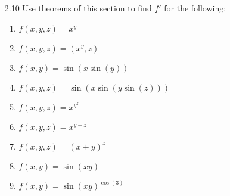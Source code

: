 \begin{enumerate}
\begin{proof}
\begin{enumerate}
        \vspace{1 cm}
        
        \( \Leftarrow \): We disagree, and offer a counter-example:
        \[
        f(x) = \begin{cases} x &, x \neq 0 \\ 1 &, x = 0  \end{cases}
        \]
        and \( g(x) = x \). Then
        \[
        \lim_{h \rightarrow 0} \frac{f(0+h) - g(0+h)}{h} = \lim_{h \rightarrow 0} \frac{h-h}{h} = 0
        \]
        Yet \( f \) is not continuous at \( 0 \), and so, a fortiori, is not differentiable at \( 0 \). However, if we insist that \( f \) be continuous at \( a \), then the proof follows from the fact that 
        \[
        \lim_{h \rightarrow 0} \frac{f(a+h) - g(a+h)}{h} = 0
        \]
        implies that
        \[
        \lim_{h \rightarrow 0} f(a+h) = a_0
        \]
        which, together with continuity, implies
        \[
        f(a) = a_0
        \]
        which gives the desired result.
        
        \item 
    \end{enumerate}
    
    \end{proof}
    
    \item[2.10] Use theorems of this section to find \( f' \) for the following:
    \begin{enumerate}
        \item \( f(x,y,z) = x^y \)
        
        \item \( f(x,y,z) = (x^y,z) \)
        
        \item \( f(x,y) = \sin(x \sin(y)) \)
        
        \item \( f(x,y,z) = \sin(x \sin (y \sin (z))) \)
        
        \item \( f(x,y,z) = x^{y^{z}} \)
        
        \item \( f(x,y,z) = x^{y+z} \)
        
        \item \( f(x,y,z) = (x+y)^z \)
        
        \item \( f(x,y) = \sin(xy) \)
        
        \item \( f(x,y) = \sin(xy)^{\cos(3)}\)
        

\end{enumerate}
\end{enumerate}
